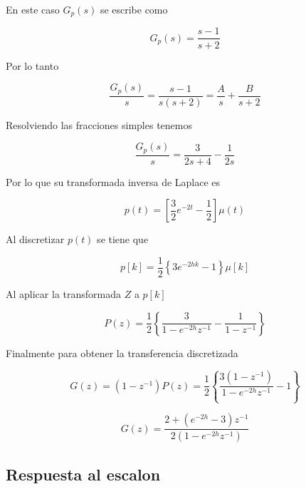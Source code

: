 \documentclass{article}
\begin{document}
    En este caso $G_p(s)$ se escribe como 

    \begin{equation}
        G_p(s) = \frac{s-1}{s+2}
    \end{equation}

    Por lo tanto 

    \begin{equation}
        \frac{G_p(s)}{s} = \frac{s-1}{s(s+2)} = \frac{A}{s} + \frac{B}{s+2}
    \end{equation}

    Resolviendo las fracciones simples tenemos 

    \begin{equation}
        \frac{G_p(s)}{s} = \frac{3}{2s + 4} - \frac{1}{2s}
    \end{equation}

    Por lo que su transformada inversa de Laplace es 

    \begin{equation}
        p(t) = \left[ \frac{3}{2} e^{-2t} - \frac{1}{2} \right] \mu(t) 
    \end{equation}

    Al discretizar $p(t)$ se tiene que 

    \begin{equation}
        p[k] = \frac{1}{2} \left\{ 3 e^{-2hk} - 1  \right\} \mu[k]
    \end{equation}

    Al aplicar la transformada $Z$ a $p[k]$ 

    \begin{equation}
        P(z) = \frac{1}{2} \left\{ \frac{3}{1 - e^{-2h}z^{-1}} - \frac{1}{1 - z^{-1}} \right\}
    \end{equation}

    Finalmente para obtener la transferencia discretizada 

    \begin{equation}
        G(z) = (1 - z^{-1}) P(z) = \frac{1}{2} \left\{ \frac{3(1 - z^{-1})}{1 - e^{-2h}z^{-1}} - 1 \right\}
    \end{equation}

    \begin{equation}
        G(z) = \frac{2 + ( e^{-2h} - 3 )z^{-1}}{2( 1 - e^{-2h}z^{-1} )}
    \end{equation}

    \subsection{Respuesta al escalon}
\end{document}
